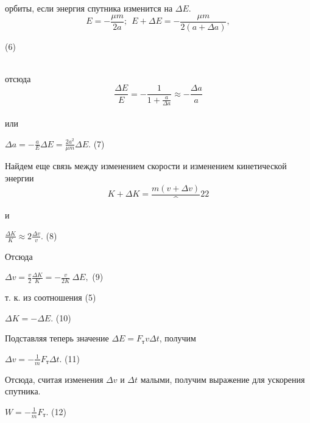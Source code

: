 \begin{multicols}{2}
орбиты, если энергия спутника изменится на $\Delta E$.\\
$$E = -\frac{\mu m}{2a};~~ E + \Delta E = -\frac{\mu m}
{2(a+\Delta a)},$$
\begin{flushright}  
    (6)  
\end{flushright}\\
отсюда\\
\[\frac{\Delta E}{E} = -\frac{1}{1 + \frac{a}{\Delta a}} \approx -\frac{\Delta a}{a}\]\\
или\\
\begin{center}
    \hfill $\Delta a = -\frac{a}{E} \Delta E = \frac{2a^2}{\mu m}\Delta E.$ \hfill (7)
\end{center}

\hspace{1.5em}Найдем еще связь между изменением скорости и изменением кинетической энергии
$$K + \Delta K = \frac{m(v + \Delta v)}^2{2}$$\\
и\\
\begin{center}
    \hfill $\frac{\Delta K}{K} \approx 2\frac{\Delta v}{v}.$ \hfill (8)
\end{center}

Отсюда\\
\begin{center}
    \hfill $\Delta v = \frac{v}{2}\frac{\Delta K}{K} = -\frac{v}{2K}~\Delta E,$ \hfill (9)
\end{center}

т. к. из соотношения (5)
\begin{center}
    \hfill $\Delta K = -\Delta E.$ \hfill (10)
\end{center}


Подставляя теперь значение $\Delta E = F_{\text{т}}v\Delta t$, получим\\
\begin{center}
   \hfill $\Delta v = -\frac{1}{m}F_\text{т}\Delta t.$ \hfill (11)
\end{center}

\hspace{1.5em}Отсюда, считая изменения $\Delta v$ и $\Delta t$ малыми, получим выражение для ускорения спутника.\\

\begin{center}
    \hfill $W = -\frac{1}{m}F_{\text{т}}.$ \hfill (12)
\end{center}
\columnbreak


\end{multicols}
